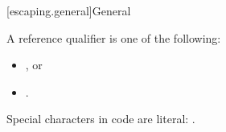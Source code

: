 [escaping.general]{General}

\pnum
A reference qualifier is one of the following:
\begin{itemize}
\item \tcode{\&}, or
\item \tcode{\&\&}.
\end{itemize}
Special characters in code are literal: \tcode{\# \% _ \{ \} \textasciitilde{} \textasciicircum{} \$ \textbackslash{}}.
